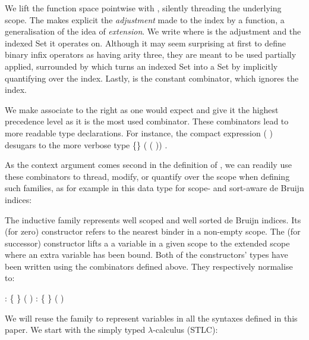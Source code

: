 \noindent
\begin{minipage}{\textwidth}
  \begin{minipage}{0.5\textwidth}
  \end{minipage}\hfill
  \begin{minipage}{0.5\textwidth}
  \end{minipage}
\end{minipage}

We lift the function space pointwise with , silently
threading the underlying scope. The  makes explicit the
\emph{adjustment} made to the index by a function, a generalisation
of the idea of \emph{extension}. We write 
  where  is the adjustment and  the indexed
Set it operates on. Although it may seem surprising at first to define
binary infix operators as having arity three, they are meant to be
used partially applied, surrounded by  which turns an
indexed Set into a Set by implicitly quantifying over the index.
Lastly,  is the constant combinator, which ignores the
index.

We make  associate to the right as one would expect and give it the
highest precedence level as it is the most used combinator. These combinators
lead to more readable type declarations.  For instance, the compact expression
\AF{∀[} (     )   \AF{]}
desugars to the more verbose type
 \{\}  (   ( ))   .

As the context argument comes second in the definition of
, we can readily use these combinators to thread,
modify, or quantify over the scope when defining such families, as for
example in this data type for scope- and sort-aware de Bruijn indices:

\begin{agdasnippet}
\end{agdasnippet}

The inductive family  represents well scoped and well sorted
de Bruijn indices. Its  (for zero) constructor refers to the
nearest binder in a non-empty scope. The  (for successor)
constructor lifts a a variable in a given scope to the extended scope
where an extra variable has been bound. Both of the constructors'
types have been written using the combinators defined above.  They
respectively normalise to:
\begin{center}
   : { \{ \}
               ( \AIC{::} )}
  \qquad
   : { \{  \}
               
               ( \AIC{::} )}
\end{center}
We will reuse the  family to represent variables in all the
syntaxes defined in this paper. We start with the simply typed
$\lambda$-calculus (STLC):

